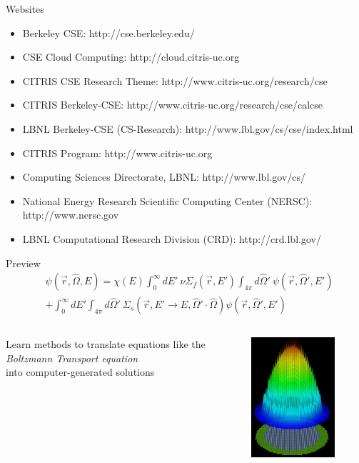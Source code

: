 \documentclass[xcolor=x11names,compress]{beamer}
\renewcommand{\(}{\begin{columns}}
\renewcommand{\)}{\end{columns}}
\newcommand{\<}[1]{\begin{column}{#1}}
\renewcommand{\>}{\end{column}}
\newcommand{\Macro}{\ensuremath{\Sigma}}
\newcommand{\vOmega}{\ensuremath{\hat{\Omega}}}
\begin{document}
\begin{frame}{Websites}
\begin{itemize}
\item Berkeley CSE: http://cse.berkeley.edu/
\item CSE Cloud Computing: http://cloud.citris-uc.org
\item CITRIS CSE Research Theme: http://www.citris-uc.org/research/cse
\item CITRIS Berkeley-CSE: http://www.citris-uc.org/research/cse/calcse	
\item LBNL Berkeley-CSE (CS-Research):  http://www.lbl.gov/cs/cse/index.html
\item CITRIS Program: http://www.citris-uc.org
\item Computing Sciences Directorate, LBNL: http://www.lbl.gov/cs/
\item National Energy Research Scientific Computing Center (NERSC): http://www.nersc.gov	
\item LBNL Computational Research Division (CRD): http://crd.lbl.gov/
\end{itemize}
\end{frame}

\begin{frame}{Preview}
\begin{align}
  [\vOmega \cdot \nabla + \Macro(\vec{r}, E)] &\psi(\vec{r}, \vOmega, E)  = \chi(E) \int_0^{\infty} dE' \:\nu \Macro_{f}(\vec{r}, E') \int_{4\pi} d\vOmega' \:\psi(\vec{r}, \vOmega', E')  \nonumber \\
   &+ \int_0^{\infty} dE' \int_{4\pi} d\vOmega' \:\Macro_{s}(\vec{r}, E' \to E, \vOmega' \cdot \vOmega) \psi(\vec{r}, \vOmega', E')  \nonumber
\end{align}
\vspace{-2em}
\begin{columns}
  \begin{column}{0.5\textwidth}
    Learn methods to translate equations like the \\\emph{Boltzmann Transport equation} \\into computer-generated solutions
  \end{column}
  \begin{column}{0.5\textwidth}
    \begin{figure}
    \includegraphics[height=1.75in,clip]{UNIC_powerDist}
    \end{figure}
  \end{column}
\end{columns}
\end{frame}
\end{document}
